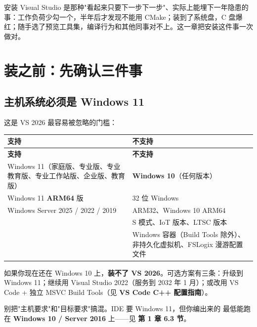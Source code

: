 安装 Visual Studio 是那种"看起来只要下一步下一步"、实际上能埋下一年隐患的事：工作负荷少勾一个，半年后才发现不能用 CMake；装到了系统盘，C 盘爆红；随手选了预览工具集，编译行为和其他同事对不上。这一章把安装这件事一次做对。

\section{装之前：先确认三件事}
\subsection{主机系统必须是 Windows 11}
这是 VS 2026 最容易被忽略的门槛：

\begin{longtable}{L{7.4cm}L{7.6cm}}
\toprule
\textbf{支持} & \textbf{不支持} \\
\midrule
\endfirsthead
\toprule
\textbf{支持} & \textbf{不支持} \\
\midrule
\endhead
\bottomrule
\endlastfoot
Windows 11（家庭版、专业版、专业教育版、专业工作站版、企业版、教育版） & \textbf{Windows 10}（任何版本） \\
Windows 11 \textbf{ARM64} 版 & 32 位 Windows \\
Windows Server 2025 / 2022 / 2019 & ARM32、Windows 10 ARM64 \\
 & S 模式、IoT 版本、LTSC 版本 \\
 & Windows 容器（Build Tools 除外）、非持久化虚拟机、FSLogix 漫游配置文件 \\
\end{longtable}

\begin{warnbox}[注意]
如果你现在还在 Windows 10 上，\textbf{装不了 VS 2026}。可选方案有三条：升级到 Windows 11；继续用 Visual Studio 2022（服务到 2032 年 1 月）；或改用 VS Code + 独立 MSVC Build Tools（见 \textbf{VS Code C++ 配置指南}）。
\end{warnbox}

\begin{tipbox}[提示]
别把"主机要求"和"目标要求"搞混。IDE 要 Windows 11，但你编出来的  最低能跑在 \textbf{Windows 10 / Server 2016} 上——见 \textbf{第 1 章 6.3 节}。
\end{tipbox}

